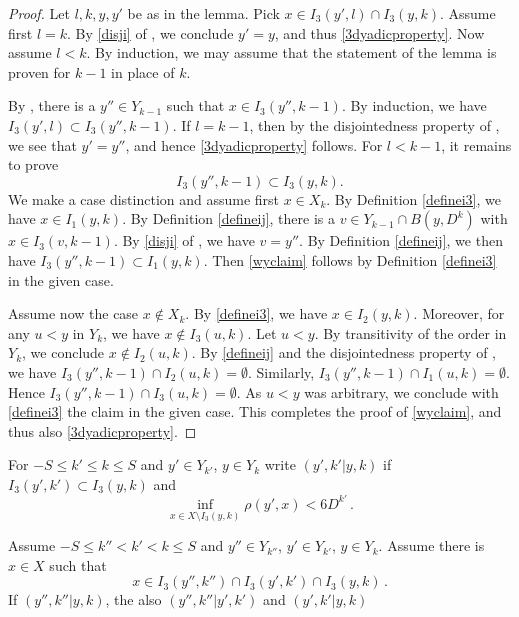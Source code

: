 \begin{proof}
Let $l,k,y,y'$ be as in the lemma. Pick $x\in I_3(y',l)\cap I_3(y,k)$. Assume first $l=k$. By \eqref{disji} of , we conclude $y'=y$, and thus \eqref{3dyadicproperty}. Now assume $l<k$. By induction, we may assume that the statement of the lemma is proven for $k-1$ in place of $k$.

By , there is a $y''\in Y_{k-1}$ such that $x\in I_3(y'',k-1)$. By induction, we have $I_3(y',l)\subset I_3(y'',k-1)$. If $l=k-1$, then by the disjointedness property of , we see that $y'=y''$, and hence \eqref{3dyadicproperty} follows. For $l<k-1$, it remains to prove
\begin{equation}\label{wyclaim}
I_3(y'',k-1)\subset I_3(y,k).
\end{equation}
We make a case distinction and assume first $x\in X_k$. By Definition \eqref{definei3}, we have $x\in I_1(y,k)$. By Definition \eqref{defineij}, there is a $v\in Y_{k-1}\cap B(y,D^k)$ with $x\in I_3(v,k-1)$. By \eqref{disji} of , we have $v=y''$. By Definition \eqref{defineij}, we then have $I_3(y'',k-1)\subset I_1(y,k)$. Then \eqref{wyclaim} follows by Definition \eqref{definei3} in the given case.

Assume now the case $x\notin X_k$. By \eqref{definei3}, we have $x\in I_2(y,k)$. Moreover, for any $u<y$ in $Y_k$, we have $x\not\in I_3(u,k)$. Let $u<y$. By transitivity of the order in $Y_k$, we conclude $x\not \in I_2(u,k)$. By \eqref{defineij} and the disjointedness property of , we have $I_3(y'',k-1)\cap I_2(u,k)= \emptyset$. Similarly, $I_3(y'',k-1)\cap I_1(u,k)= \emptyset$. Hence $I_3(y'',k-1)\cap I_3(u,k)=\emptyset$. As $u<y$ was arbitrary, we conclude with \eqref{definei3} the claim in the given case. This completes the proof of \eqref{wyclaim}, and thus also \eqref{3dyadicproperty}.
\end{proof}

For $-S\le k'\le k\le S$ and $y'\in Y_{k'}$, $y\in Y_k$
write $(y',k'|y,k)$ if $I_3(y',k')\subset I_3(y,k)$ and
\begin{equation}\label{bdcond}
    \inf_{x\in X\setminus I_3(y,k)}\rho(y',x)<6D^{k'}\, .
\end{equation}

\begin{lemma}
    \label{transitive-boundary}
    Assume $-S\le k''< k'< k\le S$ and
    $y''\in Y_{k''}$, $y'\in Y_{k'}$, $y\in Y_k$.
    Assume there is $x\in X$ such that
    \begin{equation}
    x\in I_3(y'',k'')\cap I_3(y',k')\cap I_3(y,k)\, .
    \end{equation}
    If $(y'',k''|y,k)$, the also
    $(y'',k''|y',k')$ and $(y',k'|y,k)$
\end{lemma}

